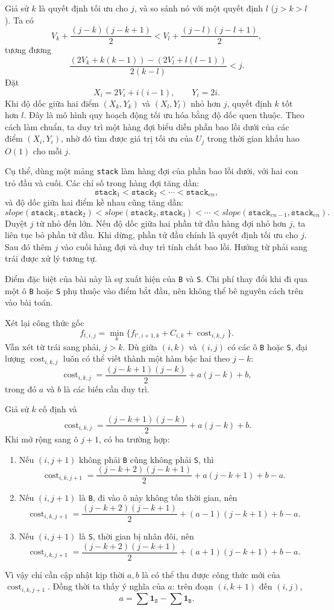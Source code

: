 \documentclass[11pt]{article}
\begin{document}
Giả sử $k$ là quyết định tối ưu cho $j$, và so sánh nó với một quyết định
$l$ ($j>k>l$). Ta có
\[
  V_k+\frac{(j-k)(j-k+1)}{2}
  <
  V_l+\frac{(j-l)(j-l+1)}{2},
\]
tương đương
\[
  \frac{(2V_k+k(k-1))-(2V_l+l(l-1))}{2(k-l)}<j.
\]
Đặt
\[
  X_i=2V_i+i(i-1),\qquad Y_i=2i.
\]
Khi độ dốc giữa hai điểm $(X_k,Y_k)$ và $(X_l,Y_l)$ nhỏ hơn $j$, quyết định
$k$ tốt hơn $l$. Đây là mô hình quy hoạch động tối ưu hóa bằng độ dốc quen
thuộc. Theo cách làm chuẩn, ta duy trì một hàng đợi biểu diễn phần bao lồi
dưới của các điểm $(X_i,Y_i)$, nhờ đó tìm được giá trị tối ưu của $U_j$ trong
thời gian khấu hao $O(1)$ cho mỗi $j$.

Cụ thể, dùng một mảng \texttt{stack} làm hàng đợi của phần bao lồi dưới, với
hai con trỏ đầu và cuối. Các chỉ số trong hàng đợi tăng dần:
\[
  \texttt{stack}_1<\texttt{stack}_2<\cdots<\texttt{stack}_{en},
\]
và độ dốc giữa hai điểm kề nhau cũng tăng dần:
\[
  slope(\texttt{stack}_1,\texttt{stack}_2)
  <
  slope(\texttt{stack}_2,\texttt{stack}_3)
  <\cdots<
  slope(\texttt{stack}_{en-1},\texttt{stack}_{en}).
\]
Duyệt $j$ từ nhỏ đến lớn. Nếu độ dốc giữa hai phần tử đầu hàng đợi nhỏ hơn
$j$, ta liên tục bỏ phần tử đầu. Khi dừng, phần tử đầu chính là quyết định tối
ưu cho $j$. Sau đó thêm $j$ vào cuối hàng đợi và duy trì tính chất bao lồi.
Hướng từ phải sang trái được xử lý tương tự.

Điểm đặc biệt của bài này là sự xuất hiện của \texttt{B} và \texttt{S}. Chi
phí thay đổi khi đi qua một ô \texttt{B} hoặc \texttt{S} phụ thuộc vào điểm
bắt đầu, nên không thể bê nguyên cách trên vào bài toán.

Xét lại công thức gốc
\[
  f_{t,i,j}
  =\min_k\{f_{t',i+1,k}+C_{i,k}+\operatorname{cost}_{i,k,j}\}.
\]
Vẫn xét từ trái sang phải, $j>k$. Dù giữa $(i,k)$ và $(i,j)$ có các ô
\texttt{B} hoặc \texttt{S}, đại lượng $\operatorname{cost}_{i,k,j}$ luôn có
thể viết thành một hàm bậc hai theo $j-k$:
\[
  \operatorname{cost}_{i,k,j}
  =
  \frac{(j-k+1)(j-k)}{2}+a(j-k)+b,
\]
trong đó $a$ và $b$ là các biến cần duy trì.

Giả sử $k$ cố định và
\[
  \operatorname{cost}_{i,k,j}
  =
  \frac{(j-k+1)(j-k)}{2}+a(j-k)+b.
\]
Khi mở rộng sang ô $j+1$, có ba trường hợp:
\begin{enumerate}
  \item Nếu $(i,j+1)$ không phải \texttt{B} cũng không phải \texttt{S}, thì
  \[
    \operatorname{cost}_{i,k,j+1}
    =
    \frac{(j-k+2)(j-k+1)}{2}+a(j-k+1)+b-a.
  \]
  \item Nếu $(i,j+1)$ là \texttt{B}, đi vào ô này không tốn thời gian, nên
  \[
    \operatorname{cost}_{i,k,j+1}
    =
    \frac{(j-k+2)(j-k+1)}{2}+(a-1)(j-k+1)+b-a.
  \]
  \item Nếu $(i,j+1)$ là \texttt{S}, thời gian bị nhân đôi, nên
  \[
    \operatorname{cost}_{i,k,j+1}
    =
    \frac{(j-k+2)(j-k+1)}{2}+(a+1)(j-k+1)+b-a.
  \]
\end{enumerate}
Vì vậy chỉ cần cập nhật kịp thời $a,b$ là có thể thu được công thức mới của
$\operatorname{cost}_{i,k,j+1}$. Đồng thời ta thấy ý nghĩa của $a$: trên đoạn
$(i,k+1)$ đến $(i,j)$,
\[
  a=\sum \mathbf{1}_{\texttt{S}}-\sum \mathbf{1}_{\texttt{B}}.
\]
\end{document}
